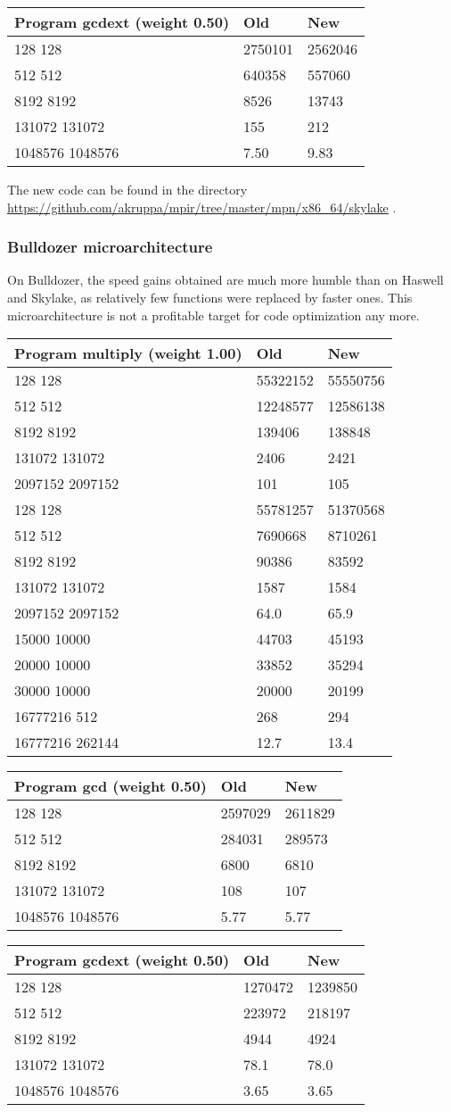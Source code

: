 \begin{longtable}[c]{@{}lll@{}}
\toprule
Program gcdext (weight 0.50) & Old & New\tabularnewline
\midrule
\endhead
128 128 & 2750101 & 2562046\tabularnewline
512 512 & 640358 & 557060\tabularnewline
8192 8192 & 8526 & 13743\tabularnewline
131072 131072 & 155 & 212\tabularnewline
1048576 1048576 & 7.50 & 9.83\tabularnewline
\bottomrule
\end{longtable}

The new code can be found in the directory
\url{https://github.com/akruppa/mpir/tree/master/mpn/x86_64/skylake} .

\subsubsection{Bulldozer
microarchitecture}\label{bulldozer-microarchitecture}

On Bulldozer, the speed gains obtained are much more humble than on
Haswell and Skylake, as relatively few functions were replaced by faster
ones. This microarchitecture is not a profitable target for code
optimization any more.

\begin{longtable}[c]{@{}lll@{}}
\toprule
Program multiply (weight 1.00) & Old & New\tabularnewline
\midrule
\endhead
128 128 & 55322152 & 55550756\tabularnewline
512 512 & 12248577 & 12586138\tabularnewline
8192 8192 & 139406 & 138848\tabularnewline
131072 131072 & 2406 & 2421\tabularnewline
2097152 2097152 & 101 & 105\tabularnewline
128 128 & 55781257 & 51370568\tabularnewline
512 512 & 7690668 & 8710261\tabularnewline
8192 8192 & 90386 & 83592\tabularnewline
131072 131072 & 1587 & 1584\tabularnewline
2097152 2097152 & 64.0 & 65.9\tabularnewline
15000 10000 & 44703 & 45193\tabularnewline
20000 10000 & 33852 & 35294\tabularnewline
30000 10000 & 20000 & 20199\tabularnewline
16777216 512 & 268 & 294\tabularnewline
16777216 262144 & 12.7 & 13.4\tabularnewline
\bottomrule
\end{longtable}

\begin{longtable}[c]{@{}lll@{}}
\toprule
Program gcd (weight 0.50) & Old & New\tabularnewline
\midrule
\endhead
128 128 & 2597029 & 2611829\tabularnewline
512 512 & 284031 & 289573\tabularnewline
8192 8192 & 6800 & 6810\tabularnewline
131072 131072 & 108 & 107\tabularnewline
1048576 1048576 & 5.77 & 5.77\tabularnewline
\bottomrule
\end{longtable}

\begin{longtable}[c]{@{}lll@{}}
\toprule
Program gcdext (weight 0.50) & Old & New\tabularnewline
\midrule
\endhead
128 128 & 1270472 & 1239850\tabularnewline
512 512 & 223972 & 218197\tabularnewline
8192 8192 & 4944 & 4924\tabularnewline
131072 131072 & 78.1 & 78.0\tabularnewline
1048576 1048576 & 3.65 & 3.65\tabularnewline
\bottomrule
\end{longtable}

